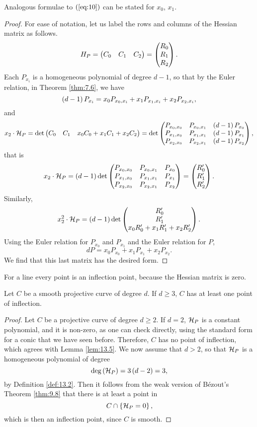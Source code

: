 \begin{remark}
Analogous formulae to $ \left( \ref{eq:10} \right) $ can be stated for $ x_0 $, $ x_1 $.
\end{remark}

\pagebreak


\begin{proof}
For ease of notation, let us label the rows and columns of the Hessian matrix as follows.
$$ H_P = \begin{pmatrix} C_0 & C_1 & C_2 \end{pmatrix} = \begin{pmatrix} R_0 \\ R_1 \\ R_2 \end{pmatrix}.
$$
Each $ P_{x_i} $ is a homogeneous polynomial of degree $ d - 1 $, so that by the Euler relation, in Theorem \ref{thm:7.6}, we have
$$ \left( d - 1 \right)P_{x_i} = x_0P_{x_0, x_i} + x_1P_{x_1, x_i} + x_2P_{x_2, x_i}, $$
and
$$ x_2 \cdot \mathcal{H}_P = \det\begin{pmatrix} C_0 & C_1 & x_0C_0 + x_1C_1 + x_2C_2 \end{pmatrix} = \det\begin{pmatrix} P_{x_0, x_0} & P_{x_0, x_1} & \left( d - 1 \right)P_{x_0} \\ P_{x_1, x_0} & P_{x_1, x_1} & \left( d - 1 \right)P_{x_1} \\ P_{x_2, x_0} & P_{x_2, x_1} & \left( d - 1 \right)P_{x_2} \end{pmatrix}, $$
that is
$$ x_2 \cdot \mathcal{H}_P = \left( d - 1 \right)\det\begin{pmatrix} P_{x_0, x_0} & P_{x_0, x_1} & P_{x_0} \\ P_{x_1, x_0} & P_{x_1, x_1} & P_{x_1} \\ P_{x_2, x_0} & P_{x_2, x_1} & P_{x_2} \end{pmatrix} = \begin{pmatrix} R_0' \\ R_1' \\ R_2' \end{pmatrix}. $$
Similarly,
$$ x_2^2 \cdot \mathcal{H}_P = \left( d - 1 \right)\det\begin{pmatrix} R_0' \\ R_1' \\ x_0R_0' + x_1R_1' + x_2R_2' \end{pmatrix}. $$
Using the Euler relation for $ P_{x_0} $ and $ P_{x_1} $ and the Euler relation for $ P $,
$$ dP = x_0P_{x_0} + x_1P_{x_1} + x_2P_{x_2}. $$
We find that this last matrix has the desired form.
\end{proof}

\begin{note*}
For a line every point is an inflection point, because the Hessian matrix is zero.
\end{note*}

\begin{lemma}
\label{lem:13.5}
Let $ C $ be a smooth projective curve of degree $ d $. If $ d \ge 3 $, $ C $ has at least one point of inflection.
\end{lemma}

\begin{proof}
Let $ C $ be a projective curve of degree $ d \ge 2 $. If $ d = 2 $, $ \mathcal{H}_P $ is a constant polynomial, and it is non-zero, as one can check directly, using the standard form for a conic that we have seen before. Therefore, $ C $ has no point of inflection, which agrees with Lemma \ref{lem:13.5}. We now assume that $ d > 2 $, so that $ \mathcal{H}_P $ is a homogeneous polynomial of degree
$$ \deg\left( \mathcal{H}_P \right) = 3\left( d - 2 \right) = 3, $$
by Definition \ref{def:13.2}. Then it follows from the weak version of B\'ezout's Theorem \ref{thm:9.8} that there is at least a point in
$$ C \cap \left\{ \mathcal{H}_P = 0 \right\}, $$
which is then an inflection point, since $ C $ is smooth.
\end{proof}

